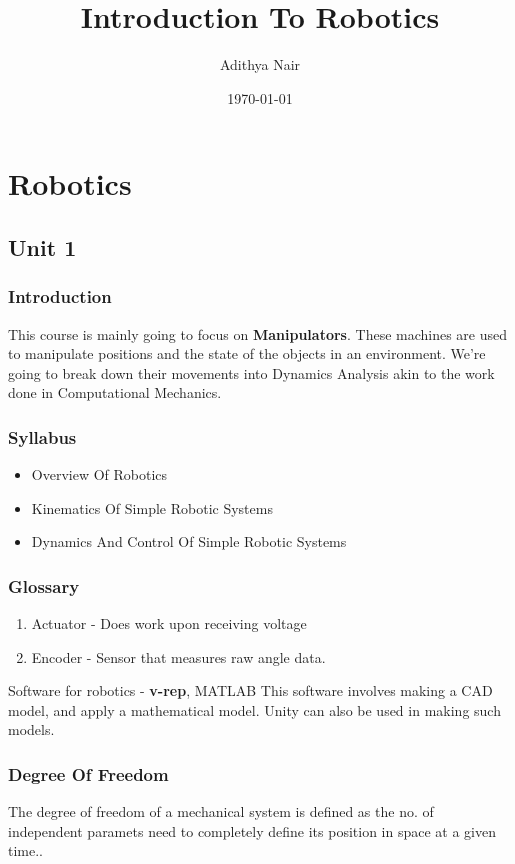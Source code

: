 \documentclass[11pt]{report}
\author{Adithya Nair}
\date{\today}
\title{Introduction To Robotics}
\begin{document}
\maketitle
\tableofcontents

\part{Robotics}
\label{sec:org029a43f}
\chapter{Unit 1}
\label{sec:org95d94ee}
\section{Introduction}
\label{sec:org1ca830f}
This course is mainly going to focus on \textbf{Manipulators}. These machines are used to manipulate positions and the state of the objects in an environment. We're going to break down their movements into Dynamics Analysis akin to the work done in Computational Mechanics.
\section{Syllabus}
\label{sec:org615e179}
\begin{itemize}
\item Overview Of Robotics
\item Kinematics Of Simple Robotic Systems
\item Dynamics And Control Of Simple Robotic Systems
\end{itemize}
\section{Glossary}
\label{sec:org90e25cf}
\begin{enumerate}
\item Actuator - Does work upon receiving voltage
\item Encoder - Sensor that measures raw angle data.
\end{enumerate}


Software for robotics - \textbf{v-rep}, MATLAB
This software involves making a CAD model, and apply a mathematical model. Unity can also be used in making such models.
\section{Degree Of Freedom}
\label{sec:orgdc4cd59}
The degree of  freedom of a mechanical system is defined as the no. of independent paramets need to completely define its position in space at a given time..
\end{document}
